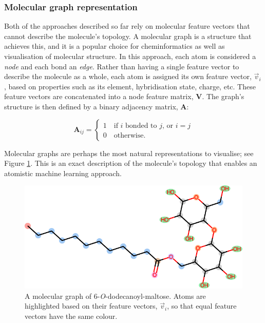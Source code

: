 \subsubsection{Molecular graph representation}

Both of the approaches described so far rely on molecular feature vectors that cannot describe the molecule's topology. A molecular graph is a structure that achieves this, and it is a popular choice for cheminformatics as well as
visualisation of molecular structure. In this approach, each atom is considered a \emph{node} and each bond an \emph{edge}. Rather than having a single feature vector to describe the molecule as a whole, each atom is assigned its own feature vector, $\vec{v}_i$, based on properties such as its element, hybridisation state, charge, etc. These feature vectors are concatenated into a node feature matrix, $\mathbf{V}$. The graph's structure is then defined by a
binary adjacency matrix, $\mathbf{A}$:

\begin{equation}
    \label{eq:adjacency-mat}
    \mathbf{A}_{ij} = \begin{cases}
        1 \quad \text{if } i \text { bonded to } j \text{, or } i = j \\
        0 \quad \text{otherwise.}
    \end{cases}
\end{equation}

Molecular graphs are perhaps the most natural representations to visualise; see Figure \ref{fig:mol-graph}. This is an exact description of the molecule's topology that enables an atomistic machine learning approach.

\begin{figure}
    \centering
    \includegraphics[width=.8\linewidth]{images/molecular-graph.pdf}
    \caption{A molecular graph of 6-\textit{O}-dodecanoyl-maltose. Atoms are
        highlighted based on their feature vectors, $\vec{v}_i$, so that equal
        feature vectors have the same colour.}
    \label{fig:mol-graph}
\end{figure}

